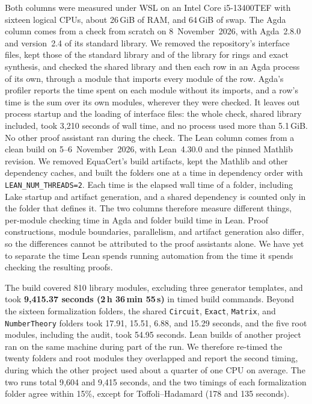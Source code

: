 \documentclass[acmsmall,screen,nonacm]{acmart}
\begin{document}
Both columns were measured under WSL on an Intel Core i5-13400TEF with sixteen logical CPUs, about 26\,GiB of RAM, and 64\,GiB of swap. The Agda column comes from a check from scratch on 8~November~2026, with Agda~2.8.0 and version~2.4 of its standard library. We removed the repository's interface files, kept those of the standard library and of the library for rings and exact synthesis, and checked the shared library and then each row in an Agda process of its own, through a module that imports every module of the row. Agda's profiler reports the time spent on each module without its imports, and a row's time is the sum over its own modules, wherever they were checked. It leaves out process startup and the loading of interface files: the whole check, shared library included, took 3{,}210 seconds of wall time, and no process used more than 5.1\,GiB. No other proof assistant ran during the check. The Lean column comes from a clean build on 5--6~November~2026, with Lean~4.30.0 and the pinned Mathlib revision. We removed EquaCert's build artifacts, kept the Mathlib and other dependency caches, and built the folders one at a time in dependency order with \texttt{LEAN\_NUM\_THREADS=2}. Each time is the elapsed wall time of a folder, including Lake startup and artifact generation, and a shared dependency is counted only in the folder that defines it. The two columns therefore measure different things, per-module checking time in Agda and folder build time in Lean. Proof constructions, module boundaries, parallelism, and artifact generation also differ, so the differences cannot be attributed to the proof assistants alone. We have yet to separate the time Lean spends running automation from the time it spends checking the resulting proofs.

The build covered 810 library modules, excluding three generator templates, and took \textbf{9{,}415.37 seconds (2\,h 36\,min 55\,s)} in timed build commands. Beyond the sixteen formalization folders, the shared \texttt{Circuit}, \texttt{Exact}, \texttt{Matrix}, and \texttt{NumberTheory} folders took 17.91, 15.51, 6.88, and 15.29 seconds, and the five root modules, including the audit, took 54.95 seconds. Lean builds of another project ran on the same machine during part of the run. We therefore re-timed the twenty folders and root modules they overlapped and report the second timing, during which the other project used about a quarter of one CPU on average. The two runs total 9{,}604 and 9{,}415 seconds, and the two timings of each formalization folder agree within 15\%, except for Toffoli--Hadamard (178 and 135 seconds).
\end{document}

